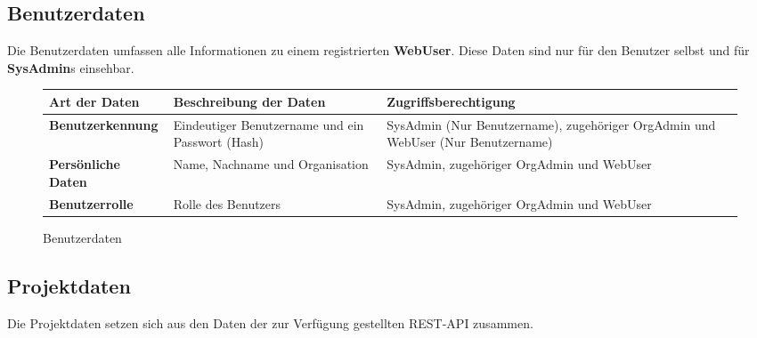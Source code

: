 \subsection{Benutzerdaten}

Die Benutzerdaten umfassen alle Informationen zu einem registrierten \textbf{WebUser}. Diese Daten sind nur f\"ur den Benutzer selbst und f\"ur \textbf{SysAdmin}s einsehbar.

\begin{figure}[h]
	\centering
	\begin{tabularx}{\textwidth}{| X || X | X |}
        \hline
		\textbf{Art der Daten} & \textbf{Beschreibung der Daten} & \textbf{Zugriffsberechtigung} \\ \hline \hline
		\textbf{Benutzerkennung} & Eindeutiger Benutzername und ein Passwort (Hash) & SysAdmin (Nur Benutzername), zugehöriger OrgAdmin und WebUser (Nur Benutzername) \\ \hline
		\textbf{Persönliche Daten} & Name, Nachname und Organisation & SysAdmin, zugehöriger OrgAdmin und WebUser \\ \hline
		\textbf{Benutzerrolle} & Rolle des Benutzers & SysAdmin, zugehöriger OrgAdmin und WebUser \\ \hline
	\end{tabularx}
	\caption{Benutzerdaten}
	\label{fig:Benutzerdaten}
\end{figure}

\newpage

\subsection{Projektdaten}

Die Projektdaten setzen sich aus den Daten der zur Verf\"ugung gestellten REST-API zusammen.

